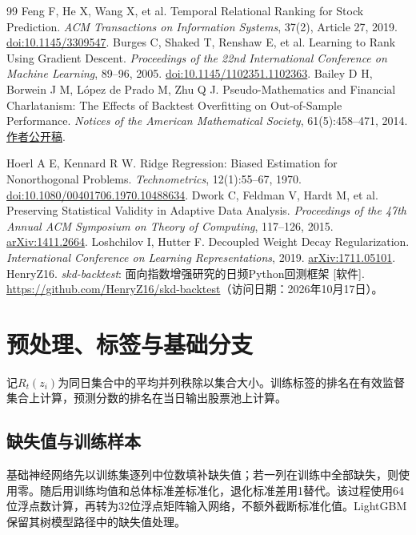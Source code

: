 \documentclass[UTF8,11pt,a4paper,fontset=fandol]{ctexart}
\begin{document}
\begin{thebibliography}{99}
 Feng F, He X, Wang X, et al. Temporal Relational Ranking for Stock Prediction. \emph{ACM Transactions on Information Systems}, 37(2), Article 27, 2019. \href{https://doi.org/10.1145/3309547}{doi:10.1145/3309547}.
 Burges C, Shaked T, Renshaw E, et al. Learning to Rank Using Gradient Descent. \emph{Proceedings of the 22nd International Conference on Machine Learning}, 89--96, 2005. \href{https://doi.org/10.1145/1102351.1102363}{doi:10.1145/1102351.1102363}.
 Bailey D H, Borwein J M, L\'opez de Prado M, Zhu Q J. Pseudo-Mathematics and Financial Charlatanism: The Effects of Backtest Overfitting on Out-of-Sample Performance. \emph{Notices of the American Mathematical Society}, 61(5):458--471, 2014. \href{https://papers.ssrn.com/sol3/papers.cfm?abstract_id=2308659}{作者公开稿}.

 Hoerl A E, Kennard R W. Ridge Regression: Biased Estimation for Nonorthogonal Problems. \emph{Technometrics}, 12(1):55--67, 1970. \href{https://doi.org/10.1080/00401706.1970.10488634}{doi:10.1080/00401706.1970.10488634}.
 Dwork C, Feldman V, Hardt M, et al. Preserving Statistical Validity in Adaptive Data Analysis. \emph{Proceedings of the 47th Annual ACM Symposium on Theory of Computing}, 117--126, 2015. \href{https://arxiv.org/abs/1411.2664}{arXiv:1411.2664}.
 Loshchilov I, Hutter F. Decoupled Weight Decay Regularization. \emph{International Conference on Learning Representations}, 2019. \href{https://arxiv.org/abs/1711.05101}{arXiv:1711.05101}.
 HenryZ16. \emph{skd-backtest}: 面向指数增强研究的日频Python回测框架 [软件]. \url{https://github.com/HenryZ16/skd-backtest}（访问日期：2026年10月17日）。
\end{thebibliography}

\clearpage
\appendix
\section{预处理、标签与基础分支}\label{app:base}
记$R_t(z_i)$为同日集合中的平均并列秩除以集合大小。训练标签的排名在有效监督集合上计算，预测分数的排名在当日输出股票池上计算。

\subsection{缺失值与训练样本}
基础神经网络先以训练集逐列中位数填补缺失值；若一列在训练中全部缺失，则使用零。随后用训练均值和总体标准差标准化，退化标准差用1替代。该过程使用64位浮点数计算，再转为32位浮点矩阵输入网络，不额外截断标准化值。LightGBM保留其树模型路径中的缺失值处理。
\end{document}
